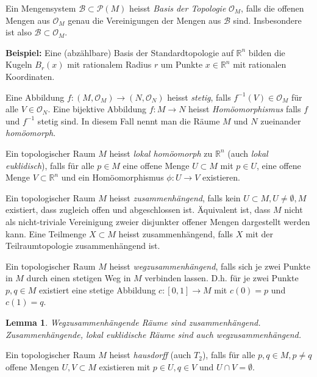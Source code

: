 \documentclass[12pt,a4paper]{article}
\def\R{\mathbb{R}}
\newtheorem{Lemma}{Lemma}[section]
\begin{document}
Ein Mengensystem $\mathcal B \subset \mathcal P(M)$ heisst {\it Basis der Topologie} $\mathcal O_M$, falls die offenen Mengen
aus $\mathcal O_M$ genau die Vereinigungen der Mengen aus $\mathcal B$ sind. Insbesondere ist also $\mathcal B \subset
\mathcal O_M$.

\medskip

{\bf Beispiel:} Eine (abz\"ahlbare) Basis der Standardtopologie auf $\R^n$ bilden die Kugeln $B_r(x)$ mit rationalem Radius $r$
um Punkte $x\in \R^n$ mit rationalen Koordinaten.



\bigskip

Eine Abbildung $f: (M, \mathcal O_M) \rightarrow (N, \mathcal O_N)$ heisst {\it stetig}, falls $f^{-1}(V) \in \mathcal O_M$
f\"ur alle $V \in \mathcal O_N$. Eine bijektive Abbildung $f:M \rightarrow N$ heisst {\it Hom\"oomorphismus} falls $f$ und
$f^{-1}$ stetig sind. In diesem Fall nennt man die R\"aume $M$ und $N$ zueinander {\it hom\"oomorph}.


\bigskip


Ein topologischer Raum $M$ heisst {\it lokal hom\"oomorph} zu $\R^n$ (auch {\it lokal euklidisch}), falls f\"ur alle $p\in M$
eine offene Menge $U\subset M$ mit $p\in U$, eine offene Menge $V \subset \R^n$ und ein Hom\"oomorphismus $\phi :U\rightarrow V$
existieren.

 \bigskip

Ein topologischer Raum $M$ heisst {\it zusammenh\"angend}, falls kein $U\subset M, U \neq \emptyset, M$ existiert, dass zugleich offen
und abgeschlossen ist. \"Aquivalent ist, dass $M$ nicht als nicht-triviale Vereinigung zweier disjunkter offener Mengen dargestellt
werden kann. Eine Teilmenge $X\subset M$ heisst zusammenh\"angend, falls $X$ mit der Teilraumtopologie zusammenh\"angend ist.

\medskip

Ein topologischer Raum $M$ heisst {\it wegzusammenh\"angend}, falls sich je zwei Punkte in $M$ durch einen stetigen Weg in $M$
verbinden lassen. D.h. f\"ur je zwei Punkte $p,q \in M$ existiert eine stetige Abbildung $c:[0,1]\rightarrow M$ mit $c(0)=p$
und $c(1)=q$.

\begin{Lemma}
Wegzusammenh\"angende R\"aume sind zusammenh\"angend. Zusammenh\"angende, lokal euklidische R\"aume sind auch wegzusammenh\"angend.
\end{Lemma}


Ein topologischer Raum $M$ heisst {\it hausdorff} (auch $T_2$), falls f\"ur alle $p,q \in M, p\neq q$ offene Mengen $U, V \subset M$
existieren mit $p\in U, q\in V$ und $U \cap V = \emptyset$.
\end{document}
